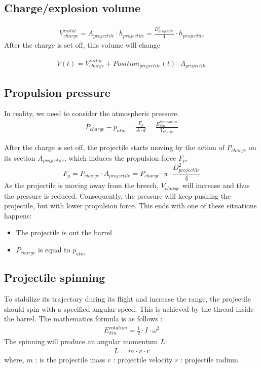 \documentclass[12pt,a4paper]{article}
\begin{document}
\subsection{Charge/explosion volume}
\begin{eqnarray}
	V_{charge}^{inital} = A_{ projectile} \cdot h_{projectile} =  \frac{D_{projectile}^2}{4} \cdot h_{projectile}
\end{eqnarray}
After the charge is set off, this volume will change

\begin{eqnarray}
	V(t) = V_{charge}^{inital} + Position_{projectile}(t) \cdot A_{projectile}
\end{eqnarray}

\subsection{Propulsion pressure}

In reality, we need to consider the atmospheric pressure. 
\begin{eqnarray}
	P_{charge} - p_{atm} = \frac{F_p}{A \cdot d} = \frac{E_{kin}^{translation}}{V_{charge}}
\end{eqnarray}


After the charge is set off, the projectile starts moving by the action of $P_{charge}$ on its section $A_{projectile}$, which induces the propulsion force $F_p$. 
\begin{equation}
	F_p = P_{charge} \cdot A_{projectile} =  P_{charge} \cdot \pi \cdot \frac{D_{projectile}^2}{4}
\end{equation}
As the projectile is moving away from the breech, $ V_{charge}$ will increase and thus the pressure is reduced. Consequently, the pressure will keep pushing the projectile, but with lower propulsion force. This ends with one of these situations happens:  
\begin{itemize}
	\item The projectile is out the barrel
	\item $P_{charge}$ is equal to $p_{atm}$
\end{itemize}

\subsection{Projectile spinning}
To stabilize its trajectory during its flight and increase the range, the projectile should spin with a specified angular speed. This is achieved by the thread inside the barrel. The mathematics formula is as follows :  
\begin{eqnarray}
	E_{kin}^{rotation} = \frac{1}{2} \cdot I \cdot \omega ^ 2
\end{eqnarray}
The spinning will produce an angular momentum $L$:
\begin{eqnarray}
	L = m \cdot v \cdot r
\end{eqnarray}
where, 
$m$ : is the projectile mass
$v$ : projectile velocity
$r$ : projectile radium
\end{document}

